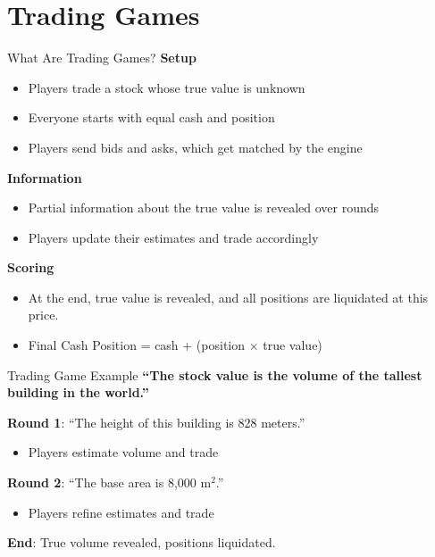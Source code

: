 \section{Trading Games}

\begin{frame}{What Are Trading Games?}
  \textbf{Setup}
  \begin{itemize}
    \item Players trade a stock whose true value is unknown
    \item Everyone starts with equal cash and position
    \item Players send bids and asks, which get matched by the engine
  \end{itemize}

  \vspace{0.3cm}
  \textbf{Information}
  \begin{itemize}
    \item Partial information about the true value is revealed over rounds
    \item Players update their estimates and trade accordingly
  \end{itemize}

  \vspace{0.3cm}
  \textbf{Scoring}
  \begin{itemize}
    \item At the end, true value is revealed, and all positions are liquidated at this price.
    \item Final Cash Position = cash + (position $\times$ true value)
  \end{itemize}
\end{frame}

\begin{frame}{Trading Game Example}
  \textbf{``The stock value is the volume of the tallest building in the world.''}

  \vspace{0.3cm}
  \textbf{Round 1}: ``The height of this building is 828 meters.''
  \begin{itemize}
    \item Players estimate volume and trade
  \end{itemize}

  \vspace{0.3cm}
  \textbf{Round 2}: ``The base area is 8,000 m$^2$.''
  \begin{itemize}
    \item Players refine estimates and trade
  \end{itemize}

  \vspace{0.3cm}
  \textbf{End}: True volume revealed, positions liquidated.
\end{frame}


